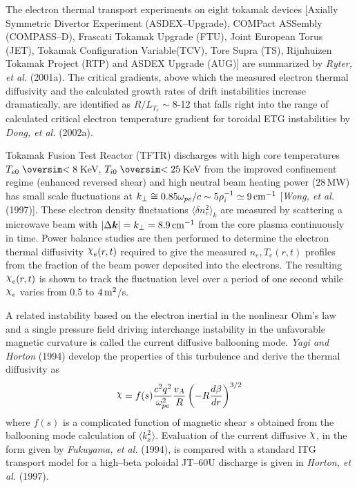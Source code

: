 \documentclass[a4paper,openany,12pt]{book}
\def\chix{\raise.5ex\hbox{$\chi$}}
\def\nms{\mathsurround=0pt}
\def\ltsim{\mathrel{\mathpalette\oversim<}} %
\def\oversim#1#2{\lower 2pt\vbox{\baselineskip 0pt \lineskip 1pt
    \ialign{$\nms#1\hfil##\hfil$\crcr#2\crcr\sim\crcr}}}
\begin{document}
The electron thermal transport experiments on eight tokamak devices [Axially Symmetric Divertor Experiment (ASDEX--Upgrade), COMPact ASSembly (COMPASS--D), Frascati Tokamak Upgrade (FTU), Joint European Torus (JET), Tokamak Configuration Variable(TCV), Tore Supra (TS), Rijnhuizen Tokamak Project (RTP) and ASDEX Upgrade (AUG)] are summarized by \emph{Ryter, et al.} (2001a). The critical gradients, above which the measured electron thermal diffusivity and the calculated growth rates of drift instabilities increase dramatically, are identified as $R/L_{T_e}\sim 8$-12 that falls right into the range of calculated critical electron temperature gradient for toroidal ETG instabilities by \emph{Dong, et al.} (2002a).

Tokamak Fusion Test Reactor (TFTR) discharges with high core temperatures $T_{e0}\ltsim 8\,$KeV, $T_{i0}\ltsim25\,$KeV from the improved confinement regime (enhanced reversed shear) and high neutral beam heating power ($28\,$MW) has small scale fluctuations at $k_\perp\cong 0.85\omega_{pe}/c\sim 5
\rho_i^{-1}\simeq 9\,\rm cm^{-1}$ [\emph{Wong, et al.} (1997)]. These electron density fluctuations 
$\langle\delta n_e^2\rangle_k$ are measured by scattering a microwave beam with $|\Delta\bm{k}| 
= k_\perp=8.9\,\rm cm^{-1}$ from the core plasma continuously in time. Power balance studies are then performed to determine the electron thermal diffusivity $\chix_e(r, t)$ required to give the measured $n_e, T_e(r, t)$ profiles from the fraction of the beam power deposited into the electrons. The resulting $\chix_e(r, t)$ is shown to track the fluctuation level over a period of one second while $\chix_e$ varies from 0.5 to $4\,\rm m^2$/s.

A related instability based on the electron inertial in the nonlinear Ohm's law and a single pressure field driving interchange instability in the unfavorable magnetic curvature is called the current diffusive ballooning mode. \emph{Yagi and Horton} (1994) develop the properties of this turbulence and derive the thermal diffusivity as
$$\chix=f(s)\frac{c^2q^2}{\omega_{pe}^2}\frac{v_A}{R}\left(-R\frac{d\beta}{dr}\right)^{3/2}$$
where $f(s)$ is a complicated function of magnetic shear $s$ obtained from the ballooning mode calculation of $\langle k_x^2\rangle$. Evaluation of the current diffusive $\chix$, in the form given by \emph{Fukuyama, et al.} (1994), is compared with a standard ITG transport model for a high--beta poloidal JT--60U discharge is given in \emph{Horton, et al.} (1997). 
\end{document}
